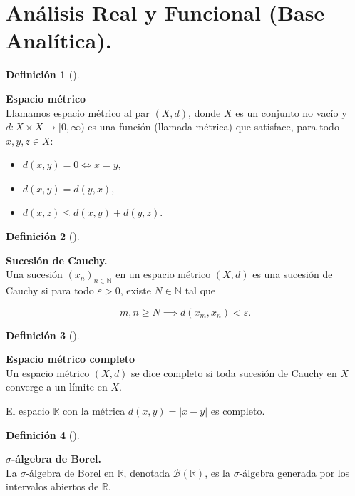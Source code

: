 \documentclass[
  spanish,
  us-letterpaper,
]{scrreprt}
\theoremstyle{plain}
\theoremstyle{plain}
\theoremstyle{definition}
\newtheorem{definition}{Definición}[chapter]
\theoremstyle{plain}
\theoremstyle{remark}
\begin{document}
\section{Análisis Real y Funcional (Base
Analítica).}\label{anuxe1lisis-real-y-funcional-base-analuxedtica.}

\begin{definition}[]\protect\hypertarget{def-espacio_metrico}{}\label{def-espacio_metrico}

\textbf{Espacio métrico}\\
Llamamos espacio métrico al par \((X, d)\), donde \(X\) es un conjunto
no vacío y \(d: X \times X \to [0, \infty)\) es una función (llamada
métrica) que satisface, para todo \(x, y, z \in X\):

\begin{itemize}
\item
  \(d(x, y) = 0 \iff x = y\),
\item
  \(d(x, y) = d(y, x)\),
\item
  \(d(x, z) \leq d(x, y) + d(y, z)\).
\end{itemize}

\end{definition}

\begin{definition}[]\protect\hypertarget{def-sucesion_cauchy}{}\label{def-sucesion_cauchy}

\textbf{Sucesión de Cauchy.}\\
Una sucesión \((x_n)_{n \in \mathbb{N}}\) en un espacio métrico
\((X, d)\) es una sucesión de Cauchy si para todo \(\varepsilon > 0\),
existe \(N \in \mathbb{N}\) tal que

\[
m, n \geq N \implies d(x_m, x_n) < \varepsilon.
\]

\end{definition}

\begin{definition}[]\protect\hypertarget{def-esp_metrico_comp}{}\label{def-esp_metrico_comp}

\textbf{Espacio métrico completo}\\
Un espacio métrico \((X, d)\) se dice completo si toda sucesión de
Cauchy en \(X\) converge a un límite en \(X\).

\end{definition}

El espacio \(\mathbb{R}\) con la métrica \(d(x, y) = |x - y|\) es
completo.

\begin{definition}[]\protect\hypertarget{def-sigma_algebra}{}\label{def-sigma_algebra}

\textbf{\(\sigma\)-álgebra de Borel.}\\
La \(\sigma\)-álgebra de Borel en \(\mathbb{R}\), denotada
\(\mathcal{B}(\mathbb{R})\), es la \(\sigma\)-álgebra generada por los
intervalos abiertos de \(\mathbb{R}\).

\end{definition}
\end{document}
